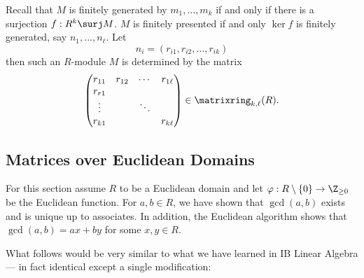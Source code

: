 \documentclass[a4paper]{article}
\theoremstyle{definition}
\begin{document}
Recall that \(M\) is finitely generated by \(m_1, \dots, m_k\) if and only if there is a surjection \(f: R^k \surj M\). \(M\) is finitely presented if and only \(\ker f\) is finitely generated, say \(n_1, \dots, n_\ell\). Let
\[
  n_i = (r_{i1}, r_{i2}, \dots, r_{ik})
\]
then such an \(R\)-module \(M\) is determined by the matrix
\[
  \begin{pmatrix}
    r_{11} & r_{12} & \cdots & r_{1\ell} \\
    r_{r1} & & & \\
    \vdots & & \ddots & \\
    r_{k1} & & & r_{k\ell}
  \end{pmatrix}
  \in \matrixring_{k, \ell}(R).
\]

\subsection{Matrices over Euclidean Domains}

For this section assume \(R\) to be a Euclidean domain and let \(\varphi: R \setminus \{0\} \to \Z_{\geq 0}\) be the Euclidean function. For \(a, b \in R\), we have shown that \(\gcd(a, b)\) exists and is unique up to associates. In addition, the Euclidean algorithm shows that \(\gcd(a, b) = ax + by\) for some \(x, y \in R\).

What follows would be very similar to what we have learned in IB Linear Algebra --- in fact identical except a single modification:
\end{document}
